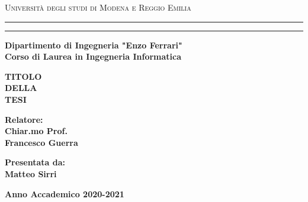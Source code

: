 \textwidth=450pt\oddsidemargin=0pt

\begin{titlepage}
    \begin{center}
        {{\Large{\textsc{Universit\`a degli studi di Modena e Reggio Emilia}}}} \rule[0.1cm]{15.8cm}{0.1mm}
        \rule[0.5cm]{15.8cm}{0.6mm}
        {\small{\bf Dipartimento di Ingegneria "Enzo Ferrari"\\
                Corso di Laurea in Ingegneria Informatica }}
    \end{center}
    \vspace{15mm}
    \begin{center}
        {\LARGE{\bf TITOLO}}\\
        \vspace{3mm}
        {\LARGE{\bf DELLA}}\\
        \vspace{3mm}
        {\LARGE{\bf TESI}}\\
    \end{center}
    \vspace{40mm}
    \par
    \noindent
    \begin{minipage}[t]{0.47\textwidth}
        {\large{\bf Relatore:\\
                Chiar.mo Prof.\\
                Francesco Guerra}}
    \end{minipage}
    \hfill
    \begin{minipage}[t]{0.47\textwidth}\raggedleft
        {\large{\bf Presentata da:\\
                Matteo Sirri}}
    \end{minipage}
    \vspace*{\fill}
    \begin{center}
        {\large{\bf Anno Accademico 2020-2021 }}
    \end{center}
\end{titlepage}
